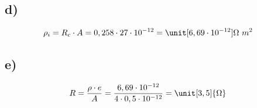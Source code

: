 \subsection*{d)}

\begin{align*}
\rho_i &= R_c \cdot A = 0,258 \cdot 27 \cdot 10^{-12} = \unit[6,69 \cdot 10^{-12}]{\Omega \ m^2}
\end{align*}


\subsection*{e)}

\begin{align*}
R &= \frac{\rho \cdot e}{A} = \frac{6,69 \cdot 10^{-12}}{4 \cdot 0,5 \cdot 10^{-12}} = \unit[3,5]{\Omega}
\end{align*}





























